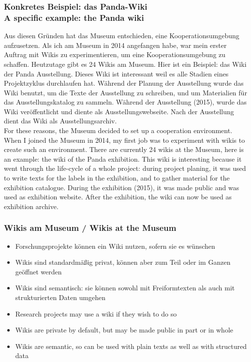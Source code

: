 {\scriptsize
\begin{frame}
  \frametitle{Konkretes Beispiel: das Panda-Wiki\\\textcolor{mfn_green}{A specific example: the Panda wiki}}
  Aus diesen Gründen hat das Museum entschieden, eine Kooperationsumgebung aufzusetzen. Als ich am Museum in 2014 angefangen habe, war mein erster Auftrag mit Wikis zu experimentieren, um eine Kooperationsumgebung zu schaffen. Heutzutage gibt es 24 Wikis am Museum. Hier ist ein Beispiel: das Wiki der Panda Ausstellung. Dieses Wiki ist interessant weil es alle Stadien eines Projektzyklus durchlaufen hat. Während der Planung der Ausstellung wurde das Wiki benutzt, um die Texte der Ausstellung zu schreiben, und um Materialien für das Ausstellungskatalog zu sammeln. Während der Ausstellung (2015), wurde das Wiki veröffentlicht und diente als Ausstellungswebseite. Nach der Ausstellung dient das Wiki als Ausstellungsarchiv. \\
  \bigskip
  \textcolor{mfn_green}{For these reasons, the Museum decided to set up a cooperation environment. When I joined the Museum in 2014, my first job was to experiment with wikis to create such an environment. There are currently 24 wikis at the Museum, here is an example: the wiki of the Panda exhibition. This wiki is interesting because it went through the life-cycle of a whole project: during project planing, it was used to write texts for the labels in the exhibition, and to gather material for the exhibition catalogue. During the exhibition (2015), it was made public and was used as exhibition website. After the exhibition, the wiki can now be used as exhibition archive.}
\end{frame}
}
\begin{frame}
  \frametitle{Wikis am Museum / \textcolor{mfn_green}{Wikis at the Museum}}

  \begin{itemize}
  \item{Forschungsprojekte können ein Wiki nutzen, sofern sie es wünschen}
  \item{Wikis sind standardmäßig privat, können aber zum Teil oder im Ganzen geöffnet werden}
  \item{Wikis sind semantisch: sie können sowohl mit Freiformtexten als auch mit strukturierten Daten umgehen}
  \end{itemize}
  
  \begin{itemize}
  \item{\textcolor{mfn_green}{Research projects may use a wiki if they wish to do so}}
  \item{\textcolor{mfn_green}{Wikis are private by default, but may be made public in part or in whole}}
  \item{\textcolor{mfn_green}{Wikis are semantic, so can be used with plain texts as well as with structured data}}
  \end{itemize}
\end{frame}

